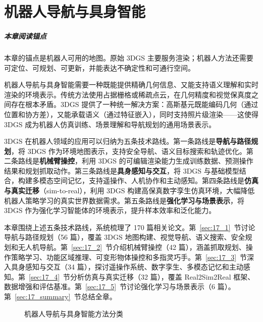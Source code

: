 \chapter{机器人导航与具身智能}
\label{ch:17}

\paragraph*{本章阅读锚点}
本章的锚点是机器人可用的地图。原始 3DGS 主要服务渲染；机器人方法还需要可定位、可规划、可更新，并能表达不确定性和可通行空间。


机器人导航与具身智能需要一种既能提供精确几何信息、又能支持语义理解和实时渲染的环境表示。传统方法使用占据栅格或稀疏点云，在几何精度和视觉保真度之间存在根本矛盾。3DGS 提供了一种统一解决方案：高斯基元既能编码几何（通过位置和协方差），又能承载语义（通过特征嵌入），同时支持照片级渲染——这使得 3DGS 成为机器人仿真训练、场景理解和导航规划的通用场景表示。

3DGS 在机器人领域的应用可以归纳为五条技术路线。第一条路线是\textbf{导航与路径规划}，将 3DGS 作为环境地图表示，支持安全导航、语义目标搜索和轨迹优化。第二条路线是\textbf{机械臂操控}，利用 3DGS 的可编辑渲染能力生成训练数据、预测操作结果和规划抓取动作。第三条路线是\textbf{具身感知与交互}，将 3DGS 与基础模型结合，构建多模态空间记忆，支持遥操作、人机协作和主动感知。第四条路线是\textbf{仿真与真实迁移}（sim-to-real），利用 3DGS 构建高保真数字孪生仿真环境，大幅降低机器人策略学习的真实世界数据需求。第五条路线是\textbf{强化学习与场景表示}，将 3DGS 作为强化学习智能体的环境表示，提升样本效率和泛化能力。

本章围绕上述五条技术路线，系统梳理了 170 篇相关论文。第~\ref{sec:17_1}~节讨论导航与路径规划（56 篇），覆盖 3DGS 地图构建、视觉导航、语义搜索、安全规划和无人机导航。第~\ref{sec:17_2}~节介绍机械臂操控（42 篇），涵盖抓取规划、操作策略学习、功能区域推理、可变形物体操控和多指灵巧手。第~\ref{sec:17_3}~节深入具身感知与交互（34 篇），探讨遥操作系统、数字孪生、多模态记忆和主动感知。第~\ref{sec:17_4}~节分析仿真与真实迁移（32 篇），覆盖 Real2Sim2Real 框架、数据增强和评估基准。第~\ref{sec:17_5}~节讨论强化学习与场景表示（6 篇）。第~\ref{sec:17_summary}~节总结全章。

\begin{figure}[htbp]
\centering
\resizebox{\textwidth}{!}{}
\caption{机器人导航与具身智能方法分类}
\label{fig:ch17_robot_taxonomy}
\end{figure}

